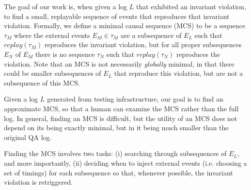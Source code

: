 The goal of our work is, when given a log $L$ that exhibited an
invariant violation, to find a small, replayable sequence of events that reproduces that
invariant violation. Formally, we define a minimal causal sequence (MCS)
to be a sequence $\tau_M$ where the external events $E_M \in \tau_M$ are a
subsequence of $E_L$ such
that $replay(\tau_M)$ reproduces the invariant violation, but for all proper
subsequences $E_N$ of $E_M$
there is no sequence $\tau_N$ such that $replay(\tau_N)$ reproduces the violation.
Note that an MCS is not necessarily {\em globally} minimal, in that there could be smaller
subsequences of $E_L$ that reproduce this violation, but are not a subsequence of this MCS.


Given a log $L$ generated from testing infrastructure,
our goal is to find an approximate MCS, so that a human can examine the MCS
rather than the full log. In general, finding an MCS is difficult, but the utility of
an MCS does not depend on its being exactly minimal, but in it being much smaller than the original QA log.

Finding the MCS involves two tasks:
(i) searching through subsequences of $E_L$, and more importantly, (ii) deciding when to inject external
events (i.e. choosing a set of timings) for each subsequence so that, whenever possible, the invariant
violation is retriggered.
